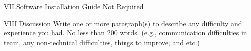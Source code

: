 VII.Software Installation Guide
Not Required

VIII.Discussion
Write one or more paragraph(s) to describe any difficulty and experience you had. No less than 200 words. (e.g., communication difficulties in team, any non-technical difficulties, things to improve, and etc.) 
